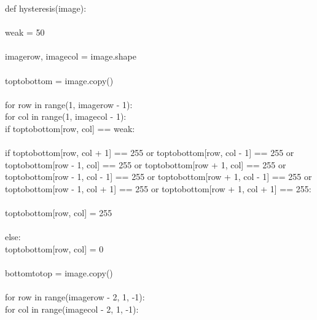 \documentclass{article}
\begin{document}
	\noindent def hysteresis(image):\\
	\\
	\indent weak = 50\\
	\\
	\indent image\textunderscore row, image\textunderscore col = image.shape\\
	\\
	\indent top\textunderscore to\textunderscore bottom = image.copy()\\
	\\
	\indent for row in range(1, image\textunderscore row - 1):\\
	\indent \indent for col in range(1, image\textunderscore col - 1):\\
	\indent \indent \indent if top\textunderscore to\textunderscore bottom[row, col] == weak:\\
	\\
	\indent \indent \indent \indent if top\textunderscore to\textunderscore bottom[row, col + 1] == 255 or top\textunderscore to\textunderscore bottom[row, col - 1] == 255 or \\
	\indent \indent \indent \indent   top\textunderscore to\textunderscore bottom[row - 1, col] == 255 or top\textunderscore to\textunderscore bottom[row + 1, col] == 255 or \\
	\indent \indent \indent \indent   top\textunderscore to\textunderscore bottom[row - 1, col - 1] == 255 or top\textunderscore to\textunderscore bottom[row + 1, col - 1] == 255 or\\
	\indent \indent \indent \indent   top\textunderscore to\textunderscore bottom[row - 1, col + 1] == 255 or top\textunderscore to\textunderscore bottom[row + 1, col + 1] == 255: \\
	\\
	\indent \indent \indent \indent \indent top\textunderscore to\textunderscore bottom[row, col] = 255\\
	\\
	\indent \indent \indent \indent else:\\
	\indent \indent \indent \indent \indent     top\textunderscore to\textunderscore bottom[row, col] = 0\\
	\\
	\indent bottom\textunderscore to\textunderscore top = image.copy()\\
	\\
	\indent for row in range(image\textunderscore row - 2, 1, -1):\\
	\indent \indent for col in range(image\textunderscore col - 2, 1, -1):\\
\end{document}
